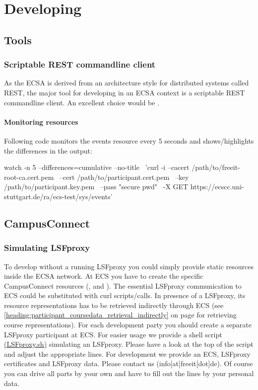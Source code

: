 \hypertarget{devel}{}
\chapter{Developing}
\section{Tools}
\subsection{Scriptable REST commandline client}
As the ECSA is derived from an architecture style for distributed systems
called REST, the major tool for developing in an ECSA context is a scriptable
REST commandline client. An excellent choice would be .
\subsubsection{Monitoring resources}
Following code monitors the events resource every 5 seconds and
shows/highlights the differences in the output:
\begin{code}
watch -n 5 --differences=cumulative --no-title \
'curl -i --cacert /path/to/freeit-root-ca.cert.pem \
     --cert /path/to/participant.cert.pem \
     --key /path/to/participant.key.pem \
     --pass "secure pwd" \
     -X GET https://ecscc.uni-stuttgart.de/ra/ecs-test/sys/events'
\end{code}

\hypertarget{devel-campusconnect}{}
\section{CampusConnect}
\subsection{Simulating LSFproxy}
To develop without a running LSFproxy you could simply provide static resources
inside the ECSA network. At ECS you have to create the specific CampusConnect
resources (,  and
). The essential LSFproxy communication to ECS
could be substituted with curl scripts/calls. In presence of a LSFproxy, its
resource representations has to be retrieved indirectly through ECS (see
\ref{heading:participant_coursedata_retrieval_indirectly} on page
\pageref{heading:participant_coursedata_retrieval_indirectly} for retrieving
course representations). For each development party you should create a
separate LSFproxy participant at ECS. For easier usage we provide a shell script
\href{http://repo.or.cz/w/ecs.git/blob_plain/HEAD:/campusconnect/scripts/lsfproxy.sh}{(LSFproxy.sh)}
simulating an LSFproxy. Please have a look at the top of the script and adjust
the appropriate lines. For development we provide an ECS, LSFproxy certificates
and LSFproxy data. Please contact us (info[at]freeit[dot]de). Of course you can
drive all parts by your own and have to fill out the lines by your personal
data.


